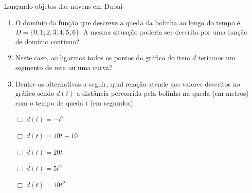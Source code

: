 \begin{task}{Lançando objetos das nuvens em Dubai}
\begin{enumerate}
\item {} 
O domínio da função que descreve a queda da bolinha ao longo do tempo é \(D = \{0 ; 1 ; 2 ; 3 ; 4 ; 5 ; 6 \}\). A mesma situação poderia ser descrita por uma função de domínio contínuo?

\item {} 
Neste caso, ao ligarmos todos os pontos do gráfico do item \(d\) teríamos um segmento de reta ou uma curva?

\item {} 
Dentre as alternativas a seguir, qual relação atende aos valores descritos no gráfico sendo \(d(t)\) a distância percorrida pela bolinha na queda (em metros) com o tempo de queda \(t\) (em segundos).

\(\Box \; d(t)= -t^2\)

\(\Box \; d(t)= 10t+10\)

\(\Box \; d(t)= 20t\)

\(\Box \; d(t)= 5t^2\)

\(\Box \; d(t)= 10t^2\)

\end{enumerate}
\end{task}

